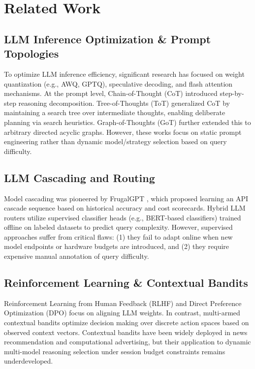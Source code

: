 \documentclass{article}
\begin{document}
\section{Related Work}
\label{sec:related}

\subsection{LLM Inference Optimization \& Prompt Topologies}
To optimize LLM inference efficiency, significant research has focused on weight quantization (e.g., AWQ, GPTQ), speculative decoding, and flash attention mechanisms. At the prompt level, Chain-of-Thought (CoT) \cite{wei2022chain} introduced step-by-step reasoning decomposition. Tree-of-Thoughts (ToT) \cite{yao2023tree} generalized CoT by maintaining a search tree over intermediate thoughts, enabling deliberate planning via search heuristics. Graph-of-Thoughts (GoT) \cite{besta2024graph} further extended this to arbitrary directed acyclic graphs. However, these works focus on static prompt engineering rather than dynamic model/strategy selection based on query difficulty.

\subsection{LLM Cascading and Routing}
Model cascading was pioneered by FrugalGPT \cite{chen2023frugalgpt}, which proposed learning an API cascade sequence based on historical accuracy and cost scorecards. Hybrid LLM routers \cite{lu2023routing} utilize supervised classifier heads (e.g., BERT-based classifiers) trained offline on labeled datasets to predict query complexity. However, supervised approaches suffer from critical flaws: (1) they fail to adapt online when new model endpoints or hardware budgets are introduced, and (2) they require expensive manual annotation of query difficulty.

\subsection{Reinforcement Learning & Contextual Bandits}
Reinforcement Learning from Human Feedback (RLHF) \cite{stiennon2020learning} and Direct Preference Optimization (DPO) focus on aligning LLM weights. In contrast, multi-armed contextual bandits \cite{agrawal2013thompson, linucb2010} optimize decision making over discrete action spaces based on observed context vectors. Contextual bandits have been widely deployed in news recommendation and computational advertising, but their application to dynamic multi-model reasoning selection under session budget constraints remains underdeveloped.
\end{document}
